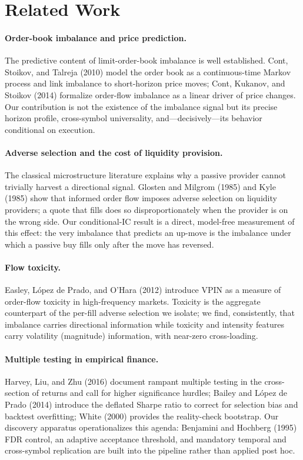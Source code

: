 \documentclass[11pt,a4paper]{article}
\theoremstyle{definition}
\theoremstyle{plain}
\begin{document}
\section{Related Work}
\label{sec:related}

\paragraph{Order-book imbalance and price prediction.}
The predictive content of limit-order-book imbalance is well established. Cont, Stoikov, and
Talreja (2010) model the order book as a continuous-time Markov process and link imbalance to
short-horizon price moves; Cont, Kukanov, and Stoikov (2014) formalize order-flow imbalance as a
linear driver of price changes. Our contribution is not the existence of the imbalance signal but
its precise horizon profile, cross-symbol universality, and---decisively---its behavior
conditional on execution.

\paragraph{Adverse selection and the cost of liquidity provision.}
The classical microstructure literature explains why a passive provider cannot trivially harvest
a directional signal. Glosten and Milgrom (1985) and Kyle (1985) show that informed order flow
imposes adverse selection on liquidity providers; a quote that fills does so disproportionately
when the provider is on the wrong side. Our conditional-IC result is a direct, model-free
measurement of this effect: the very imbalance that predicts an up-move is the imbalance under
which a passive buy fills only after the move has reversed.

\paragraph{Flow toxicity.}
Easley, L\'opez de Prado, and O'Hara (2012) introduce VPIN as a measure of order-flow toxicity in
high-frequency markets. Toxicity is the aggregate counterpart of the per-fill adverse selection
we isolate; we find, consistently, that imbalance carries directional information while toxicity
and intensity features carry volatility (magnitude) information, with near-zero cross-loading.

\paragraph{Multiple testing in empirical finance.}
Harvey, Liu, and Zhu (2016) document rampant multiple testing in the cross-section of returns and
call for higher significance hurdles; Bailey and L\'opez de Prado (2014) introduce the deflated
Sharpe ratio to correct for selection bias and backtest overfitting; White (2000) provides the
reality-check bootstrap. Our discovery apparatus operationalizes this agenda: Benjamini and
Hochberg (1995) FDR control, an adaptive acceptance threshold, and mandatory temporal and
cross-symbol replication are built into the pipeline rather than applied post hoc.
\end{document}
